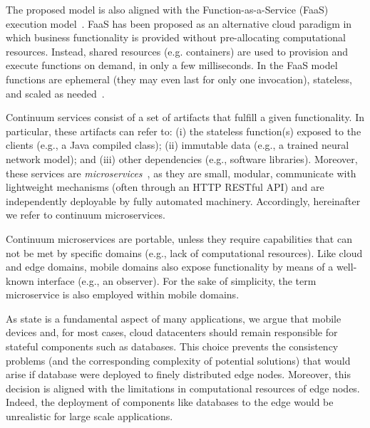 The proposed model is also aligned with the Function-as-a-Service (FaaS) execution model~\cite{MateosFaaster17}. FaaS has been proposed as an alternative cloud paradigm in which business functionality is provided without pre-allocating computational resources. Instead, shared resources (e.g. containers) are used to provision and execute functions on demand, in only a few milliseconds. In the FaaS model functions are ephemeral (they may even last for only one invocation), stateless, and scaled as needed~\cite{Roberts:2016}. 

Continuum services consist of a set of artifacts that fulfill a given functionality. In particular, these artifacts can refer to: (i) the stateless function(s) exposed to the clients (e.g., a Java compiled class); (ii) immutable data (e.g., a trained neural network model); and (iii) other dependencies (e.g.,  software libraries). Moreover, these services are \textit{microservices}~\cite{lewis2014microservices}, as they are small, modular, communicate with lightweight mechanisms (often through an HTTP RESTful API) and are independently deployable by fully automated machinery. Accordingly, hereinafter we refer to continuum microservices.

Continuum microservices are portable, unless they require capabilities that can not be met by specific domains (e.g., lack of computational resources). Like cloud and edge domains, mobile domains also expose functionality by means of a well-known interface (e.g., an observer). For the sake of simplicity, the term microservice is also employed within mobile domains.

As state is a fundamental aspect of many applications, we argue that mobile devices and, for most cases, cloud datacenters should remain responsible for stateful components such as databases. This choice prevents the consistency problems (and the corresponding complexity of potential solutions) that would arise if database were deployed to finely distributed edge nodes. Moreover, this decision is aligned with the limitations in computational resources of edge nodes. Indeed, the deployment of components like databases to the edge would be unrealistic for large scale applications.



